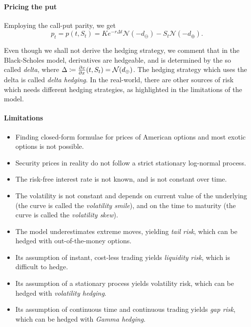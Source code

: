 \paragraph{Pricing the put}
Employing the call-put parity, we get
\begin{equation}
	\label{eq:continous-put-pr}
	p_t = p(t, S_t) = K e^{-r \Delta t} \mathcal{N}(- d_{\ominus}) - S_t \mathcal{N}(- d_{\oplus}).
\end{equation}


\begin{rem}[Hedging]
	Even though we shall not derive the hedging strategy, we comment that in the Black-Scholes model, derivatives are hedgeable, and is determined by the so called \emph{delta}, where $ \Delta \coloneqq \pd{c}{x}(t,S_t) = \mathcal{N}(d_{\oplus}) $. The hedging strategy which uses the delta is called \emph{delta hedging}. In the real-world, there are other sources of risk which needs different hedging strategies, as highlighted in the limitations of the model.
\end{rem}


\paragraph{Limitations}
\begin{itemize}
	\item Finding closed-form formulae for prices of American options and most exotic options is not possible.
	\item Security prices in reality do not follow a strict stationary log-normal process.
	\item The risk-free interest rate is not known, and is not constant over time.
	\item The volatility is not constant and depends on current value of the underlying (the curve is called the \emph{volatility smile}), and on the time to maturity (the curve is called the \emph{volatility skew}).
	\item The model underestimates extreme moves, yielding \emph{tail risk}, which can be hedged with out-of-the-money options.
	\item Its assumption of instant, cost-less trading yields \emph{liquidity risk}, which is difficult to hedge.
	\item Its assumption of a stationary process yields volatility risk, which can be hedged with \emph{volatility hedging}.
	\item Its assumption of continuous time and continuous trading yields \emph{gap risk}, which can be hedged with \emph{Gamma hedging}.
\end{itemize}



